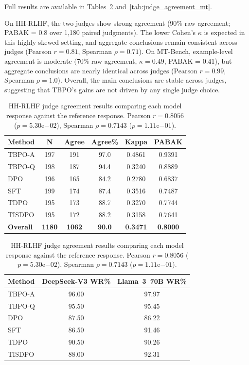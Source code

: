 \documentclass{article}
\theoremstyle{plain}
\theoremstyle{definition}
\theoremstyle{remark}
\begin{document}
Full results are available in Tables~\ref{tab:judge_agreement_hh} and~\ref{tab:judge_agreement_mt}.

On HH-RLHF, the two judges show strong agreement (90\% raw agreement; PABAK = 0.8 over 1{,}180 paired judgments). The lower Cohen's $\kappa$ is expected in this highly skewed setting, and aggregate conclusions remain consistent across judges (Pearson $r = 0.81$, Spearman $\rho = 0.71$). On MT-Bench, example-level agreement is moderate (70\% raw agreement, $\kappa = 0.49$, PABAK = 0.41), but aggregate conclusions are nearly identical across judges (Pearson $r = 0.99$, Spearman $\rho = 1.0$). Overall, the main conclusions are stable across judges, suggesting that TBPO's gains are not driven by any single judge choice.

\begin{table}[t]
\centering
\small
\setlength{\tabcolsep}{8pt}
\renewcommand{\arraystretch}{1.15}
\begin{tabular}{lccccc}
\toprule
\textbf{Method} & \textbf{N} & \textbf{Agree} & \textbf{Agree\%} & \textbf{Kappa} & \textbf{PABAK} \\
\midrule
TBPO-A & 197 & 191 & 97.0 & 0.4861 & 0.9391 \\
TBPO-Q & 198 & 187 & 94.4 & 0.3240 & 0.8889 \\
DPO & 196 & 165 & 84.2 & 0.2780 & 0.6837 \\
SFT & 199 & 174 & 87.4 & 0.3516 & 0.7487 \\
TDPO & 195 & 173 & 88.7 & 0.3270 & 0.7744 \\
TISDPO & 195 & 172 & 88.2 & 0.3158 & 0.7641 \\
\midrule
\textbf{Overall} & \textbf{1180} & \textbf{1062} & \textbf{90.0} & \textbf{0.3471} & \textbf{0.8000} \\
\bottomrule
\end{tabular}

\vspace{0.8em}

\begin{tabular}{lcc}
\toprule
\textbf{Method} & \textbf{DeepSeek-V3 WR\%} & \textbf{Llama~3~70B WR\%} \\
\midrule
TBPO-A & 96.00 & 97.97 \\
TBPO-Q & 95.50 & 95.45 \\
DPO & 87.50 & 86.22 \\
SFT & 86.50 & 91.46 \\
TDPO & 90.50 & 90.26 \\
TISDPO & 88.00 & 92.31 \\
\bottomrule
\end{tabular}
\caption{HH-RLHF judge agreement results comparing each model response against the reference response. Pearson $r = 0.8056$ ($p = 5.30\mathrm{e}{-02}$), Spearman $\rho = 0.7143$ ($p = 1.11\mathrm{e}{-01}$).}
\label{tab:judge_agreement_hh}
\end{table}
\end{document}

